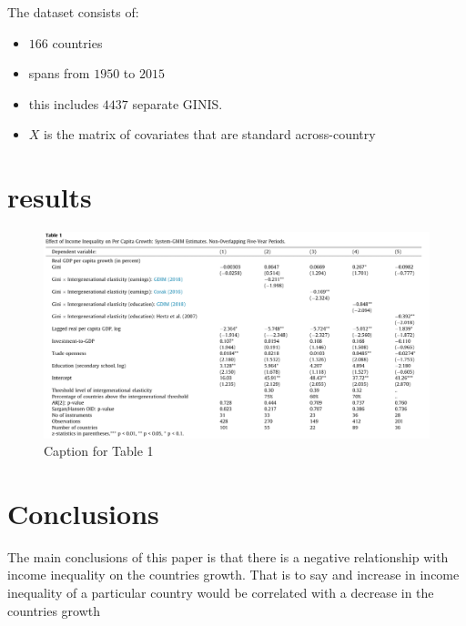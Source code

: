 \documentclass[10pt, oneside]{article}
\begin{document}
The dataset consists of:
\begin{itemize}
	\item $166$ countries
	\item spans from $1950$ to $2015$
	\item this includes $4437$ separate GINIS.
	\item $X$ is the matrix of covariates that are standard across-country
\end{itemize}

\section{results}

\begin{figure}[h]  %
	\centering
	\includegraphics[width=\textwidth]{table_1.png}  %
	\caption{Caption for Table 1}
\end{figure}


\section{Conclusions}

The main conclusions of this paper is that there is a negative relationship with income inequality on the countries growth. That is to say and increase
in income inequality of a particular country would be correlated with a decrease in the countries growth

\printbibliography
\end{document}
